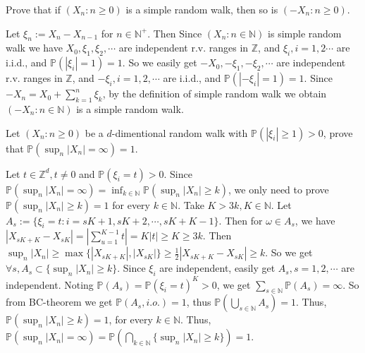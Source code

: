 \documentclass[../main]{subfiles}
\begin{document}
\begin{problem}\label{pro:1}
  Prove that if \((X_n:n \geq 0)\) is a simple random walk, then so is \((-X_n:n \geq 0)\).
\end{problem}

\begin{solution}
  Let \(\xi_n:=X_n-X_{n-1}\) for \(n \in \mathbb{N}^+\). Then Since \((X_n:n \in \mathbb{N})\) is simple random walk we have
  \(X_0,\xi_1,\xi_2,\cdots\) are independent r.v. ranges in \(\mathbb{Z}\), and
  \(\xi_i,i=1,2\cdots\) are i.i.d., and \(\mathbb{P}(|\xi_i|=1)=1\).
  So we easily get \(-X_0,-\xi_1,-\xi_2,\cdots\) are independent r.v. ranges in \(\mathbb{Z}\),
  and \(-\xi_i,i=1,2,\cdots\) are i.i.d., and \(\mathbb{P}(|-\xi_i|=1)=1\).
  Since \(-X_n=X_0+\sum_{k=1}^{n}\xi_k\), by the definition of simple random walk we obtain \((-X_n:n \in \mathbb{N})\) is a simple random walk.
\end{solution}

\begin{problem}\label{pro:2}
  Let \((X_n:n \geq 0)\) be a \(d\)-dimentional random walk with \(\mathbb{P}(|\xi_i|\geq 1)>0\), prove that \(\mathbb{P}(\sup_{n}|X_n|=\infty)=1\).
\end{problem}
\begin{solution}
  Let \(t \in \mathbb{Z}^d,t \neq 0\) and \(\mathbb{P}(\xi_i=t)>0\).
  Since \(\mathbb{P}(\sup_{n}|X_n|=\infty)=\inf_{k \in \mathbb{N}}\mathbb{P}(\sup_{n}|X_n| \geq k)\),
  we only need to prove \(\mathbb{P}(\sup_{n}|X_n|\geq k)=1\) for every \(k \in \mathbb{N}\).
  Take \(K>3k,K \in \mathbb{N}\).
  Let \(A_s:=\{\xi_i=t:i=sK+1,sK+2,\cdots,sK+K-1\}\).
  Then for \(\omega \in A_s\), we have \(|X_{sK+K}-X_{sK}|=|\sum_{u=1}^{K-1} t|=K|t|\geq K \geq 3k\).
  Then \(\sup_n|X_n|\geq \max\{|X_{sK+K}|,|X_{sK}|\}\geq \frac{1}{2}|X_{sK+K}-X_{sK}|\geq k\).
  So we get \(\forall s,A_s \subset \{\sup_n|X_n| \geq k\}\).
  Since \(\xi_i\) are independent, easily get \(A_s,s=1,2,\cdots\) are independent.
  Noting \(\mathbb{P}(A_s)=\mathbb{P}(\xi_i=t)^K>0\), we get \(\sum_{s \in \mathbb{N}} \mathbb{P}(A_s)=\infty\).
  So from BC-theorem we get \(\mathbb{P}(A_s,i.o.)=1\), thus \(\mathbb{P}(\bigcup_{s \in \mathbb{N}}A_s)=1\).
  Thus, \(\mathbb{P}(\sup_n|X_n| \geq k)=1\), for every \(k \in \mathbb{N}\).
  Thus, \(\mathbb{P}(\sup_n|X_n|=\infty)=\mathbb{P}(\bigcap_{k \in \mathbb{N}}\{\sup_n|X_n|\geq k\})=1\).
\end{solution}
\end{document}
